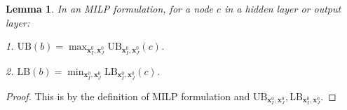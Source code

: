 \documentclass[]{article}
\newtheorem{lemma}{Lemma}
\theoremstyle{definition}
\newcommand{\ReLU}{\mathrm{ReLU}}
\newcommand{\UB}{\mathrm{UB}}
\newcommand{\LB}{\mathrm{LB}}
\newcommand{\B}{\mathrm{B}}
\begin{document}
\begin{lemma} In an MILP formulation, for a node $c$ in a hidden layer or output layer:
	
	1. $\UB(b)=\max_{\boldsymbol{x}^0_I,\boldsymbol{x}^0_J}\UB_{\boldsymbol{x}^0_I,\boldsymbol{x}^0_J}(c)$. 
	
		2. $\LB(b)=\min_{\boldsymbol{x}^0_I,\boldsymbol{x}^0_J}\LB_{\boldsymbol{x}^0_I,\boldsymbol{x}^0_J}(c)$. 
\end{lemma}

\begin{proof}
	This is by the definition of MILP formulation and $\UB_{\boldsymbol{x}^0_I,\boldsymbol{x}^0_J}, \LB_{\boldsymbol{x}^0_I,\boldsymbol{x}^0_J}$.
\end{proof}

%
%	
%	
%	
%	
%	
\end{document}
